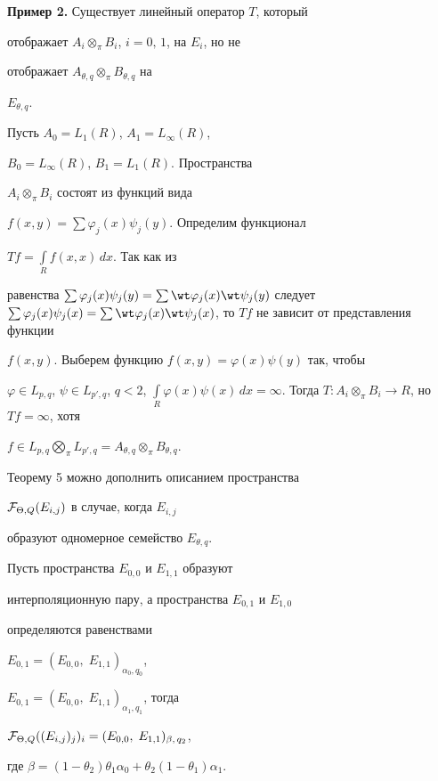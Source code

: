 \medskip





{\bf Пример 2.} Существует линейный оператор $T$, который


отображает $A_i\otimes_{\pi}B_i$, $i=0,\,1$, на $E_i$, но не


отображает $A_{\theta,q}\otimes_{\pi}B_{\theta,q}$ на


$E_{\theta,q}$.


\medskip





Пусть $A_0=L_1(R)$, $A_1=L_{\infty }(R)$,


$B_0=L_{\infty }(R)$, $B_1=L_1(R)$. Пространства


$A_i\otimes_{\pi}B_i$ состоят из функций вида


$f(x,y)= \sum \varphi_j(x) \psi_j(y)$. Определим функционал


$Tf=\int\limits_R f(x,x)\,dx$. Так как из


равенства $\sum \varphi_j(x) \psi_j(y)= \sum \wt \varphi_j(x)


\wt \psi_j(y)$ следует $\sum \varphi_j(x) \psi_j(x)= \sum \wt \varphi_j(x)


\wt \psi_j(x)$, то $Tf$ не зависит от представления функции


$f(x,y)$. Выберем функцию $f(x,y) = \varphi(x) \psi (y)$ так, чтобы


$\varphi \in L_{p,q}$, $\psi \in L_{p',q}$, $q<2$, $\int\limits_R\varphi


(x)\psi (x)\,dx =\infty$. Тогда $T:A_i\otimes_{\pi}B_i


\rightarrow R$, но $Tf=\infty$, хотя


$f\in L_{p,q}\bigotimes_{\pi}L_{p',q}=


A_{\theta,q}\otimes_{\pi}B_{\theta, q}$.





Теорему 5 можно дополнить описанием пространства


${\cal F}_{\Theta,Q}(E_{i,j})$ в случае, когда $E_{i,j}$


образуют одномерное семейство $E_{\theta,q}$.





\begin{thm}


Пусть пространства $E_{0,0}$ и $E_{1,1}$ образуют


интерполяционную пару, а пространства $E_{0,1}$ и $E_{1,0}$


определяются равенствами


$E_{0,1}=(E_{0,0},\;E_{1,1})_{\alpha_0,q_0}$,


$E_{0,1}=(E_{0,0},\;E_{1,1})_{\alpha_1,q_1}$, тогда


${\cal F}_{\Theta,Q} ((E_{i,j})_j)_i =(E_{0,0},\;E_{1,1})_{\beta,\,q_2}$,


где $\beta=(1-\theta_2)\theta_1 \alpha_0+\theta_2(1-\theta_1)\alpha_1$.


\end{thm}





